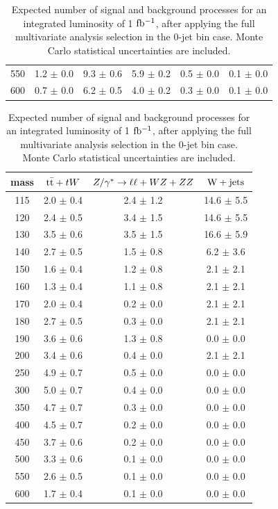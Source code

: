 \begin{table}[!ht]
\begin{center}
{\begin{tabular} {|c|c|c|c|c|c|}
550 &   1.2 $\pm$   0.0 &   9.3 $\pm$   0.6  &   5.9 $\pm$   0.2 &   0.5 $\pm$   0.0 &   0.1 $\pm$   0.0 \\
600 &   0.7 $\pm$   0.0 &   6.2 $\pm$   0.5  &   4.0 $\pm$   0.2 &   0.3 $\pm$   0.0 &   0.1 $\pm$   0.0 \\
 \hline
  \end{tabular}
  }
 {\normalsize
  \begin{tabular} {|c|c|c|c|}
\hline
  mass    & $\mathrm{t}\bar{\mathrm{t}}+tW$ & $Z/\gamma^*\to\ell\ell+WZ+ZZ$ & $\mathrm{W+jets}$ \\
  \hline
  \hline
115 &  2.0 $\pm$	0.4 &	2.4 $\pm$   1.2 &  14.6 $\pm$   5.5 \\
120 &  2.4 $\pm$	0.5 &	3.4 $\pm$   1.5 &  14.6 $\pm$   5.5 \\
130 &  3.5 $\pm$	0.6 &	3.5 $\pm$   1.5 &  16.6 $\pm$   5.9 \\
140 &  2.7 $\pm$	0.5 &	1.5 $\pm$   0.8 &   6.2 $\pm$   3.6 \\
150 &  1.6 $\pm$	0.4 &	1.2 $\pm$   0.8 &   2.1 $\pm$   2.1 \\
160 &  1.3 $\pm$	0.4 &	1.1 $\pm$   0.8 &   2.1 $\pm$   2.1 \\
170 &  2.0 $\pm$	0.4 &	0.2 $\pm$   0.0 &   2.1 $\pm$   2.1 \\
180 &  2.7 $\pm$	0.5 &	0.3 $\pm$   0.0 &   2.1 $\pm$   2.1 \\
190 &  3.6 $\pm$	0.6 &	1.3 $\pm$   0.8 &   0.0 $\pm$   0.0 \\
200 &  3.4 $\pm$	0.6 &	0.4 $\pm$   0.0 &   2.1 $\pm$   2.1 \\
250 &  4.9 $\pm$	0.7 &	0.5 $\pm$   0.0 &   0.0 $\pm$   0.0 \\
300 &  5.0 $\pm$	0.7 &	0.4 $\pm$   0.0 &   0.0 $\pm$   0.0 \\
350 &  4.7 $\pm$	0.7 &	0.3 $\pm$   0.0 &   0.0 $\pm$   0.0 \\
400 &  4.5 $\pm$	0.7 &	0.2 $\pm$   0.0 &   0.0 $\pm$   0.0 \\
450 &  3.7 $\pm$	0.6 &	0.2 $\pm$   0.0 &   0.0 $\pm$   0.0 \\
500 &  3.3 $\pm$	0.6 &	0.1 $\pm$   0.0 &   0.0 $\pm$   0.0 \\
550 &  2.6 $\pm$	0.5 &	0.1 $\pm$   0.0 &   0.0 $\pm$   0.0 \\
600 &  1.7 $\pm$	0.4 &	0.1 $\pm$   0.0 &   0.0 $\pm$   0.0 \\
 \hline
  \end{tabular}
  }
  \caption{Expected number of signal and background processes for an 
  integrated luminosity of 1 $\mathrm{fb^{-1}}$, after applying the full multivariate analysis 
  selection in the 0-jet bin case. Monte Carlo statistical uncertainties are included.}
   \label{tab:mvasel0j}
  \end{center}
\end{table}

